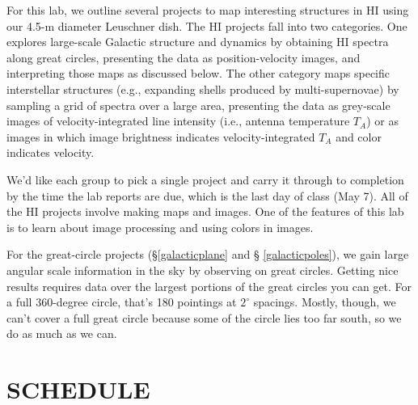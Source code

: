 \documentclass[psfig,preprint]{aastex}
\begin{document}
For this lab, we outline several projects to map interesting structures
in HI using our 4.5-m diameter Leuschner dish. The HI projects
fall into two categories. One explores large-scale Galactic structure
and dynamics by obtaining HI spectra along great circles, presenting the
data as position-velocity images, and interpreting those maps as
discussed below. The other category maps specific interstellar
structures (e.g., expanding shells produced by multi-supernovae) by
sampling a grid of spectra over a large area, presenting the data as
grey-scale images of velocity-integrated line intensity (i.e., antenna
temperature $T_A$) or as images in which image brightness indicates
velocity-integrated $T_A$ and color indicates velocity.

We'd like each group to pick a single project and carry it through to
completion by the time the lab reports are due, which is the last day of
class (May 7). All of the HI projects involve making maps and
images. One of the features of this lab is to learn about image
processing and using colors in images.

For the great-circle projects (\S \ref{galacticplane} and \S
\ref{galacticpoles}), we gain large angular scale information
in the sky by observing on great circles. Getting nice results
requires data over the largest portions of the great circles you can
get. For a full 360-degree circle, that's 180 pointings at $2^\circ$
spacings.  Mostly, though, we can't cover a full great circle because
some of the circle lies too far south, so we do as much as we can. 

\section{SCHEDULE}
\end{document}
